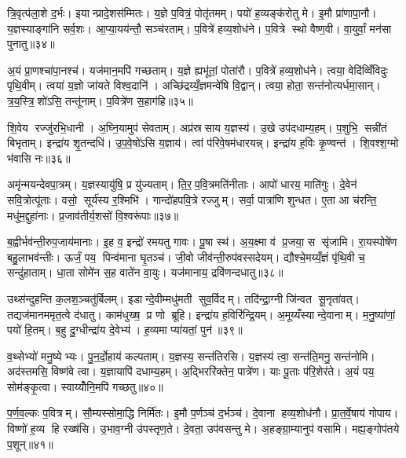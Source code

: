 त्रि॒वृत्प॑ला॒शे द॒र्भः। इयान्प्रादे॒शस॑म्मितः। य॒ज्ञे प॒वित्रं॒ पोतृ॑तमम्। पयो॑ ह॒व्यङ्क॑रोतु मे। इ॒मौ प्रा॑णापा॒नौ। य॒ज्ञस्याङ्गा॑नि सर्व॒शः। आ॒प्या॒यय॑न्तौ॒ सञ्च॑रताम्। प॒वित्रे॑ हव्य॒शोध॑ने। प॒वित्रे स्थो वैष्ण॒वी। वा॒युर्वां॒ मन॑सा पुनातु॥३४॥

अ॒यं प्रा॒णश्चा॑पा॒नश्च॑। यज॑मान॒मपि॑ गच्छताम्। य॒ज्ञे ह्यभू॑तां॒ पोता॑रौ। प॒वित्रे॑ हव्य॒शोध॑ने। त्वया॒ वेदि॑व्विँविदुः पृथि॒वीम्। त्वया॑ य॒ज्ञो जा॑यते विश्व॒दानि॑। अच्छि॑द्रय्यँ॒ज्ञमन्वे॑षि वि॒द्वान्। त्वया॒ होता॒ सन्त॑नोत्यर्धमा॒सान्। त्र॒य॒स्त्रि॒शो॑ऽसि॒ तन्तू॑नाम्। प॒वित्रे॑ण स॒हाग॑हि॥३५॥

शि॒वेय रज्जु॑रभि॒धानी। अ॒घ्नि॒यामुप॑ सेवताम्। अप्र॑स्रसाय य॒ज्ञस्य॑। उ॒खे उप॑दधाम्य॒हम्। प॒शुभि॒ सन्नी॑तं बिभृताम्। इन्द्रा॑य शृ॒तन्दधि॑। उ॒प॒वे॒षो॑ऽसि य॒ज्ञाय॑। त्वां प॑रिवे॒षम॑धारयन्न्। इन्द्रा॑य ह॒विः कृ॒ण्वन्त॑। शि॒वश्श॒ग्मो भ॑वासि नः॥३६॥

अमृ॑न्मयन्देवपा॒त्रम्। य॒ज्ञस्यायु॑षि॒ प्र यु॑ज्यताम्। ति॒र॒प॒वि॒त्रमति॑नीताः। आपो॑ धारय॒ माति॑गुः। दे॒वेन॑ सवि॒त्रोत्पू॑ताः। वसो॒ सूर्य॑स्य र॒श्मिभि॑। गान्दो॑हपवि॒त्रे रज्जुम्। सर्वा॒ पात्रा॑णि शुन्धत। ए॒ता आ च॑रन्ति॒ मधु॑म॒द्दुहा॑नाः। प्र॒जाव॑तीर्य॒शसो॑ वि॒श्वरू॑पाः॥३७॥

ब॒ह्वीर्भव॑न्ती॒रुप॒जाय॑मानाः। इ॒ह व॒ इन्द्रो॑ रमयतु गावः। पू॒षा स्थ॑। अ॒य॒क्ष्मा व॑ प्र॒जया॒ स सृ॑जामि। रा॒यस्पोषे॑ण बहु॒लाभव॑न्तीः। ऊर्जं॒ पय॒ पिन्व॑माना घृ॒तञ्च॑। जी॒वो जीव॑न्ती॒रुप॑वस्सदेयम्। द्यौश्चे॒मय्यँ॒ज्ञं पृ॑थि॒वी च॒ सन्दु॑हाताम्। धा॒ता सोमे॑न स॒ह वाते॑न वा॒युः। यज॑मानाय॒ द्रवि॑णन्दधातु॥३८॥

उथ्स॑न्दुहन्ति क॒लश॒ञ्चतु॑र्बिलम्। इडान्दे॒वीम्मधु॑मती सुव॒र्विदम्। तदि॑न्द्रा॒ग्नी जि॑न्वत सू॒नृता॑वत्। तद्यज॑मानममृत॒त्वे द॑धातु। काम॑धुख्ष॒ प्र णो ब्रूहि। इन्द्रा॑य ह॒विरि॑न्द्रि॒यम्। अ॒मूय्यँस्यान्दे॒वानाम्। म॒नु॒ष्या॑णां॒ पयो॑ हि॒तम्। ब॒हु दु॒ग्धीन्द्रा॑य दे॒वेभ्य॑। ह॒व्यमा प्या॑यतां॒ पुन॑॥३९॥

व॒थ्सेभ्यो॑ मनु॒ष्येभ्यः। पु॒न॒र्दो॒हाय॑ कल्पताम्। य॒ज्ञस्य॒ सन्त॑तिरसि। य॒ज्ञस्य॑ त्वा॒ सन्त॑ति॒मनु॒ सन्त॑नोमि। अद॑स्तमसि॒ विष्ण॑वे त्वा। य॒ज्ञायापि॑ दधाम्य॒हम्। अ॒द्भिररि॑क्तेन॒ पात्रे॑ण। याः पू॒ताः प॑रि॒शेर॑ते। अ॒यं पय॒ सोम॑ङ्कृ॒त्वा। स्वाय्योँनि॒मपि॑ गच्छतु॥४०॥

प॒र्ण॒व॒ल्कः प॒वित्रम्। सौ॒म्यस्सोमा॒द्धि निर्मि॑तः। इ॒मौ प॒र्णञ्च॑ द॒र्भञ्च॑। दे॒वाना हव्य॒शोध॑नौ। प्रा॒त॒र्वे॒षाय॑ गोपाय। विष्णो॑ ह॒व्य हि रख्ष॑सि। उ॒भाव॒ग्नी उ॑पस्तृण॒ते। दे॒वता॒ उप॑वसन्तु मे। अ॒हङ्ग्रा॒म्यानुप॑ वसामि। मह्य॒ङ्गोप॑तये प॒शून्॥४१॥\anuvakamend[आभृ॑त इ॒मङ्गृ॑ह्णामि॒ पूर्व॒स्ताः पूर्व॒ परि॑गृह्णामि सभापा॒ला इन्द्र॑ज्येष्ठेभ्य॒ आदि॑त्य व्रतपते सुसं॒भृता॑ मे स॒ह पु॑नातु गहि नो वि॒श्वरू॑पा दधातु॒ पुन॑र्गच्छतु प॒शून् (याःपु॒रस्ता॑दि॒मामूर्ज॑मि॒ह प्र॒जा इ॒ह प॒शवो॒ऽयं पि॑तृ॒णाम॒ग्निः। )]

